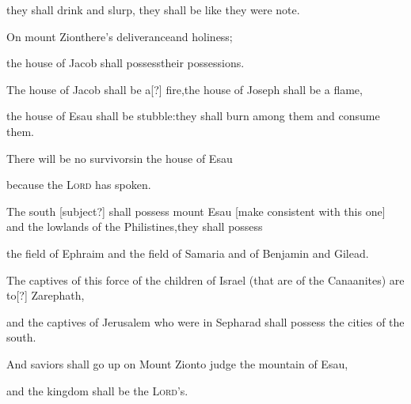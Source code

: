 \begin{inparaenum}
  \pb they shall drink and slurp,%
  \pa they shall be like they were note.%
  
  \pa {} On mount Zion\pa there's deliverance\pa and holiness;%
  
  \pb the house of Jacob shall possess\pa their possessions.%
  
  \pa {} The house of Jacob shall be a[?] fire,\pa the house of Joseph shall be a flame,%
  
  \pb the house of Esau shall be stubble:\pa they shall burn among them and consume them.%
  
  \pb There will be no survivors\pa in the house of Esau%
  
  \pb because the \textsc{Lord} has spoken.%
  
  \pb {} The south [subject?] shall possess mount Esau [make consistent with this one] and the lowlands of the Philistines,\pa they shall possess%
  
  \pb the field%
  of Ephraim and the field of Samaria and of Benjamin%
  and Gilead.%
  
  \pb {} The captives of this force of the children of Israel (that are of the Canaanites) are to[?] Zarephath,%
  
  \pb and the captives of Jerusalem who were in Sepharad shall possess the cities of the south.%
  
  \pb {} And saviors shall go up on Mount Zion\pa to judge the mountain of Esau,%
  
  \pc and the kingdom shall be the \textsc{Lord}'s.%
\end{inparaenum}
